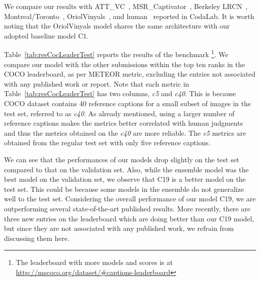 We compare our results with ATT\_VC~\cite{you2016image},
MSR\_Captivator~\cite{Fang2015}, Berkeley LRCN~\cite{donahue2015long},
Montreal/Toronto~\cite{Xu2015show}, OriolVinyals~\cite{Vinyals_2015_CVPR}, and
human~\cite{Chen2015} reported in CodaLab. It is worth noting that the
OriolVinyals model shares the same architecture with our adopted baseline model
C1.

Table~\ref{tab:resCocLeaderTest} reports the results of the benchmark%
\footnote{The leaderboard with more models and
scores is at \url{http://mscoco.org/dataset/\#captions-leaderboard}}.
We compare our model with the other submissions within the top ten ranks in the
COCO leaderboard, as per METEOR metric, excluding the entries not associated
with any published work or report.
Note that each metric in Table~\ref{tab:resCocLeaderTest} has two columns, \emph{c5}
and \emph{c40}. 
This is because COCO dataset contains 40 reference captions for a small subset
of images in the test set, referred to as \emph{c40}. 
As already mentioned, using a larger number of reference captions makes the
metrics better correlated with human judgments and thus the metrics obtained on
the \emph{c40} are more reliable.
The \emph{c5} metrics are obtained from the regular test set with only five
reference captions. 

We can see that the performances of our models drop slightly on the test set
compared to that on the validation set. 
Also, while the ensemble model was the best model on the validation set, we
observe that C19 is a better model on the test set.
This could be because some models in the ensemble do not generalize well to the
test set.
Considering the overall performance of our model C19, we are outperforming
several state-of-the-art published results.
More recently, there are three new entries on the leaderboard which are doing
better than our C19 model, but since they are not associated with any published
work, we refrain from discussing them here.

